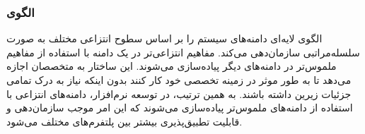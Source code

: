 \subsubsection{الگوی }
\label{archLayerSec}
\begin{RTL}
الگوی لایه‌ای دامنه‌های سیستم را بر اساس سطوح انتزاعی مختلف به صورت سلسله‌مراتبی
سازمان‌دهی می‌کند. مفاهیم انتزاعی‌تر در یک دامنه با استفاده
از مفاهیم ملموس‌تر در دامنه‌های دیگر پیاده‌سازی می‌شوند.
این ساختار به متخصصان اجازه می‌دهد تا به طور موثر در زمینه تخصصی
خود کار کنند بدون اینکه نیاز به درک تمامی جزئیات زیرین
داشته باشند. به همین ترتیب، در توسعه نرم‌افزار،
دامنه‌های انتزاعی با استفاده از دامنه‌های ملموس‌تر پیاده‌سازی
می‌شوند که این امر موجب سازمان‌دهی و قابلیت تطبیق‌پذیری بیشتر بین
پلتفرم‌های مختلف می‌شود.
\end{RTL}